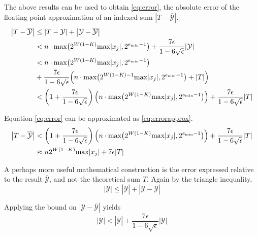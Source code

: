     The above results can be used to obtain  \eqref{eq:error}, the absolute
    error of the floating point approximation of an indexed sum $|T - \overline{\mathcal{Y}}|$.
    \begin{align}
      \left|T - \overline{\mathcal{Y}}\right| &\leq |T - \mathcal{Y}| + \left|\mathcal{Y} - \overline{\mathcal{Y}}\right| \nonumber \\
      &< n \cdot \max\bigl(2^{W  (1 - K)}  \max|x_j|, 2^{e_{\min} - 1}\bigr) + \frac{7\epsilon}{1 - 6\sqrt\epsilon} |\mathcal{Y}| \nonumber \\
      &< n \cdot \max\bigl(2^{W  (1 - K)}  \max|x_j|, 2^{e_{\min} - 1}\bigr) \nonumber \\
      &+ \frac{7\epsilon}{1 - 6\sqrt\epsilon} \Bigl(n \cdot \max\bigl(2^{W  (1 - K) - 1}  \max|x_j|, 2^{e_{\min} - 1}\bigr) + |T|\Bigr) \nonumber \\
      &< \left(1 + \frac{7\epsilon}{1 - 6\sqrt\epsilon}\right) \Bigl(n \cdot \max\bigl(2^{W (1 - K)} \max|x_j|, 2^{e_{\min} - 1}\bigr)\Bigr) + \frac{7\epsilon}{1 - 6\sqrt\epsilon} |T|
      \label{eq:error}
    \end{align}

    Equation \eqref{eq:error} can be approximated as \eqref{eq:errorapprox}.
    \begin{align}
      \left|T - \overline{\mathcal{Y}}\right| &< \left(1 + \frac{7\epsilon}{1 - 6\sqrt\epsilon}\right) \Bigl(n \cdot \max\bigl(2^{W (1 - K)} \max|x_j|, 2^{e_{\min} - 1}\bigr)\Bigr) + \frac{7\epsilon}{1 - 6\sqrt\epsilon} |T| \nonumber \\
    &\approx n 2^{W  (1 - K)} \max|x_j| + 7  \epsilon |T|
      \label{eq:errorapprox}
    \end{align}

    A perhaps more useful mathematical construction is the error expressed
    relative to the result $\overline{\mathcal{Y}}$, and not the theoretical
    sum $T$. Again by the triangle inequality,
    \begin{equation*}
      |\mathcal{Y}| \leq \left|\overline{\mathcal{Y}}\right| + \left|\mathcal{Y} - \overline{\mathcal{Y}}\right|
    \end{equation*}

    Applying the bound on $|\mathcal{Y} - \overline{\mathcal{Y}}|$ yields
    \begin{equation*}
      |\mathcal{Y}| < \left|\overline{\mathcal{Y}}\right| + \frac{7\epsilon}{1 - 6\sqrt\epsilon}|\mathcal{Y}|
    \end{equation*}

